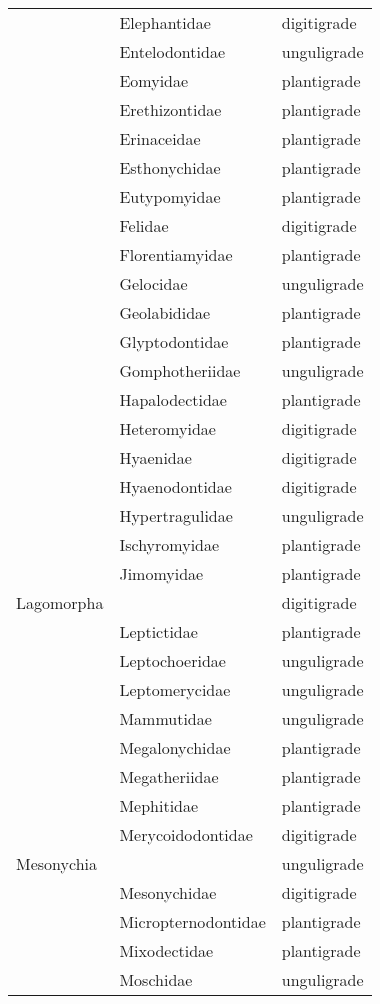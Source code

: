 \begin{center}
\begin{longtable}{ l l l }
    & Elephantidae & digitigrade \\ 
    & Entelodontidae & unguligrade \\ 
    & Eomyidae & plantigrade \\ 
    & Erethizontidae & plantigrade \\ 
    & Erinaceidae & plantigrade \\ 
    & Esthonychidae & plantigrade \\ 
    & Eutypomyidae & plantigrade \\ 
    & Felidae & digitigrade \\ 
    & Florentiamyidae & plantigrade \\ 
    & Gelocidae & unguligrade \\ 
    & Geolabididae & plantigrade \\ 
    & Glyptodontidae & plantigrade \\ 
    & Gomphotheriidae & unguligrade \\ 
    & Hapalodectidae & plantigrade \\ 
    & Heteromyidae & digitigrade \\ 
    & Hyaenidae & digitigrade \\ 
    & Hyaenodontidae & digitigrade \\ 
    & Hypertragulidae & unguligrade \\ 
    & Ischyromyidae & plantigrade \\ 
    & Jimomyidae & plantigrade \\ 
    Lagomorpha &  & digitigrade \\ 
    & Leptictidae & plantigrade \\ 
    & Leptochoeridae & unguligrade \\ 
    & Leptomerycidae & unguligrade \\ 
    & Mammutidae & unguligrade \\ 
    & Megalonychidae & plantigrade \\ 
    & Megatheriidae & plantigrade \\ 
    & Mephitidae & plantigrade \\ 
    & Merycoidodontidae & digitigrade \\ 
    Mesonychia &  & unguligrade \\ 
    & Mesonychidae & digitigrade \\ 
    & Micropternodontidae & plantigrade \\ 
    & Mixodectidae & plantigrade \\ 
    & Moschidae & unguligrade \\ 

\end{longtable}
\end{center}
